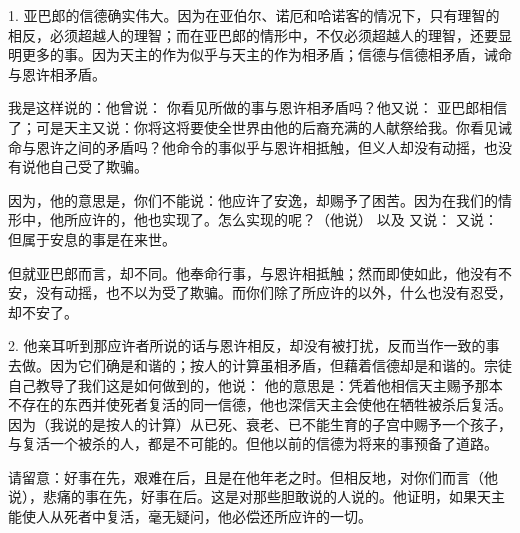 1. 亚巴郎的信德确实伟大。因为在亚伯尔、诺厄和哈诺客的情况下，只有理智的相反，必须超越人的理智；而在亚巴郎的情形中，不仅必须超越人的理智，还要显明更多的事。因为天主的作为似乎与天主的作为相矛盾；信德与信德相矛盾，诫命与恩许相矛盾。\par

我是这样说的：他曾说：    你看见所做的事与恩许相矛盾吗？他又说：  亚巴郎相信了；可是天主又说：你将这将要使全世界由他的后裔充满的人献祭给我。你看见诫命与恩许之间的矛盾吗？他命令的事似乎与恩许相抵触，但义人却没有动摇，也没有说他自己受了欺骗。\par

因为，他的意思是，你们不能说：他应许了安逸，却赐予了困苦。因为在我们的情形中，他所应许的，他也实现了。怎么实现的呢？（他说）      以及  又说：  又说：  但属于安息的事是在来世。\par

但就亚巴郎而言，却不同。他奉命行事，与恩许相抵触；然而即使如此，他没有不安，没有动摇，也不以为受了欺骗。而你们除了所应许的以外，什么也没有忍受，却不安了。\par

2. 他亲耳听到那应许者所说的话与恩许相反，却没有被打扰，反而当作一致的事去做。因为它们确是和谐的；按人的计算虽相矛盾，但藉着信德却是和谐的。宗徒自己教导了我们这是如何做到的，他说： 他的意思是：凭着他相信天主赐予那本不存在的东西并使死者复活的同一信德，他也深信天主会使他在牺牲被杀后复活。因为（我说的是按人的计算）从已死、衰老、已不能生育的子宫中赐予一个孩子，与复活一个被杀的人，都是不可能的。但他以前的信德为将来的事预备了道路。\par

请留意：好事在先，艰难在后，且是在他年老之时。但相反地，对你们而言（他说），悲痛的事在先，好事在后。这是对那些胆敢说的人说的。他证明，如果天主能使人从死者中复活，毫无疑问，他必偿还所应许的一切。\par

